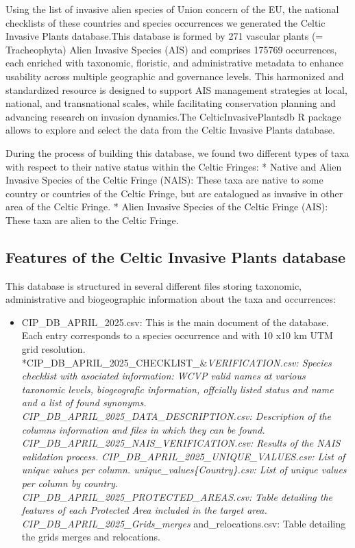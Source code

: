 \documentclass[
]{article}
\providecommand{\tightlist}{%
  \setlength{\itemsep}{0pt}\setlength{\parskip}{0pt}}
\begin{document}
Using the list of invasive alien species of Union concern of the EU, the
national checklists of these countries and species occurrences we
generated the Celtic Invasive Plants database.This database is formed by
271 vascular plants (= Tracheophyta) Alien Invasive Species (AIS) and
comprises 175769 occurrences, each enriched with taxonomic, floristic,
and administrative metadata to enhance usability across multiple
geographic and governance levels. This harmonized and standardized
resource is designed to support AIS management strategies at local,
national, and transnational scales, while facilitating conservation
planning and advancing research on invasion dynamics.The
CelticInvasivePlantsdb R package allows to explore and select the data
from the Celtic Invasive Plants database.

During the process of building this database, we found two different
types of taxa with respect to their native status within the Celtic
Fringes: * Native and Alien Invasive Species of the Celtic Fringe
(NAIS): These taxa are native to some country or countries of the Celtic
Fringe, but are catalogued as invasive in other area of the Celtic
Fringe. * Alien Invasive Species of the Celtic Fringe (AIS): These taxa
are alien to the Celtic Fringe.

\subsection{Features of the Celtic Invasive Plants
database}\label{features-of-the-celtic-invasive-plants-database}

This database is structured in several different files storing
taxonomic, administrative and biogeographic information about the taxa
and occurrences:

\begin{itemize}
\tightlist
\item
  CIP\_DB\_APRIL\_2025.csv: This is the main document of the database.
  Each entry corresponds to a species occurrence and with 10 x10 km UTM
  grid resolution.
  *CIP\_DB\_APRIL\_2025\_CHECKLIST\_\&\emph{VERIFICATION.csv: Species
  checklist with asociated information: WCVP valid names at various
  taxonomic levels, biogeografic information, offcially listed status
  and name and a list of found synonyms.
  \emph{CIP\_DB\_APRIL\_2025\_DATA\_DESCRIPTION.csv: Description of the
  columns information and files in which they can be found.
  }CIP\_DB\_APRIL\_2025\_NAIS\_VERIFICATION.csv: Results of the NAIS
  validation process. \emph{CIP\_DB\_APRIL\_2025\_UNIQUE\_VALUES.csv:
  List of unique values per column. }unique\_values\{Country\}.csv: List
  of unique values per column by country.
  \emph{CIP\_DB\_APRIL\_2025\_PROTECTED\_AREAS.csv: Table detailing the
  features of each Protected Area included in the target area.
  }CIP\_DB\_APRIL\_2025\_Grids\_merges} and\_relocations.csv: Table
  detailing the grids merges and relocations.
\end{itemize}
\end{document}
